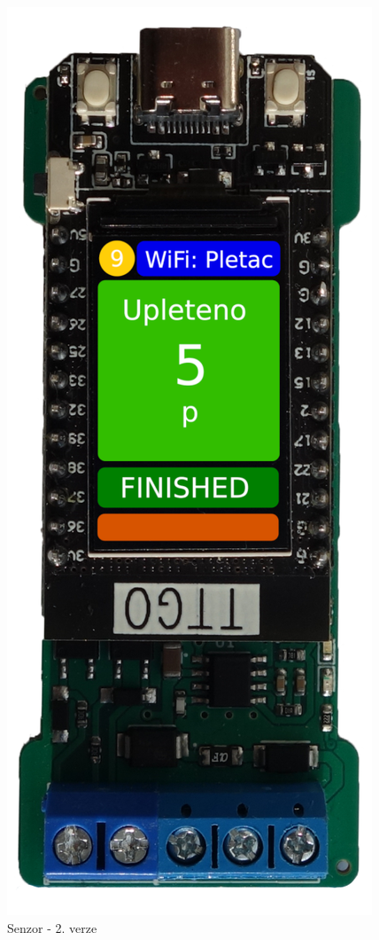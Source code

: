 \begin{figure}[htbp]
    \centering
    \includegraphics[width=\textwidth/2]{img/V2-deska-esp-screen.png}
    \caption{Senzor - 2. verze}
    \label{fig:SenzorV2}
\end{figure}


\newpage